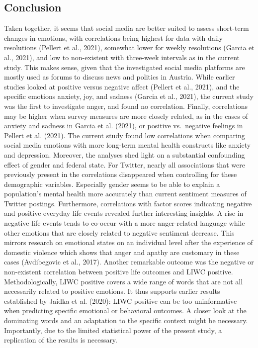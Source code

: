 \documentclass[
  english,
  jou,floatsintext]{apa7}
\begin{document}
\hypertarget{conclusion}{%
\subsection{Conclusion}\label{conclusion}}

Taken together, it seems that social media are better suited to assess short-term changes in emotions, with correlations being highest for data with daily resolutions (Pellert et al., 2021), somewhat lower for weekly resolutions (Garcia et al., 2021), and low to non-existent with three-week intervals as in the current study. This makes sense, given that the investigated social media platforms are mostly used as forums to discuss news and politics in Austria. While earlier studies looked at positive versus negative affect (Pellert et al., 2021), and the specific emotions anxiety, joy, and sadness (Garcia et al., 2021), the current study was the first to investigate anger, and found no correlation. Finally, correlations may be higher when survey measures are more closely related, as in the cases of anxiety and sadness in Garcia et al. (2021), or positive vs.~negative feelings in Pellert et al. (2021). The current study found low correlations when comparing social media emotions with more long-term mental health constructs like anxiety and depression. Moreover, the analyses shed light on a substantial confounding effect of gender and federal state. For Twitter, nearly all associations that were previously present in the correlations disappeared when controlling for these demographic variables. Especially gender seems to be able to explain a population's mental health more accurately than current sentiment measures of Twitter postings. Furthermore, correlations with factor scores indicating negative and positive everyday life events revealed further interesting insights. A rise in negative life events tends to co-occur with a more anger-related language while other emotions that are closely related to negative sentiment decrease. This mirrors research on emotional states on an individual level after the experience of domestic violence which shows that anger and apathy are customary in these cases (Avdibegovic et al., 2017). Another remarkable outcome was the negative or non-existent correlation between positive life outcomes and LIWC positive. Methodologically, LIWC positive covers a wide range of words that are not all necessarily related to positive emotions. It thus supports earlier results established by Jaidka et al. (2020): LIWC positive can be too uninformative when predicting specific emotional or behavioral outcomes. A closer look at the dominating words and an adaptation to the specific context might be necessary. Importantly, due to the limited statistical power of the present study, a replication of the results is necessary.
\end{document}
